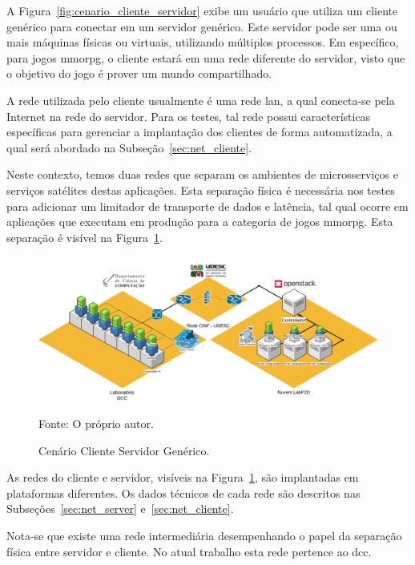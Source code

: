 A Figura~\ref{fig:cenario_cliente_servidor} exibe um usuário que utiliza um cliente genérico para conectar em um servidor genérico.
%
Este servidor pode ser uma ou mais máquinas físicas ou virtuais, utilizando múltiplos processos.
%
Em específico, para jogos \ac{mmorpg}, o cliente estará em uma rede diferente do servidor, visto que o objetivo do jogo é prover um mundo compartilhado.



A rede utilizada pelo cliente usualmente é uma rede \ac{lan}, a qual conecta-se pela Internet na rede do servidor.
%
Para os testes, tal rede possui características específicas para gerenciar a implantação dos clientes de forma automatizada, a qual será abordado na Subseção~\ref{sec:net_cliente}.




Neste contexto, temos duas redes que separam os ambientes de microsserviços e serviços satélites destas aplicações.
%
Esta separação física é necessária nos testes para adicionar um limitador de transporte de dados e latência, tal qual ocorre em aplicações que executam em produção para a categoria de jogos \ac{mmorpg}.
%
Esta separação é visível na Figura~\ref{fig:net_completa}.

\begin{figure}[htb!]
  \caption{Cenário Cliente Servidor Genérico.}
  \label{fig:net_completa}
  \includegraphics[width=\textwidth]{figuras/ambiente/full.png}
  \centering

  Fonte: O próprio autor.
\end{figure}

As redes do cliente e servidor, visíveis na Figura~\ref{fig:net_completa}, são implantadas em plataformas diferentes.
%
Os dados técnicos de cada rede são descritos nas Subseções~\ref{sec:net_server} e~\ref{sec:net_cliente}.



Nota-se que existe uma rede intermediária desempenhando o papel da separação física entre servidor e cliente.
%
No atual trabalho esta rede pertence ao \ac{dcc}.

